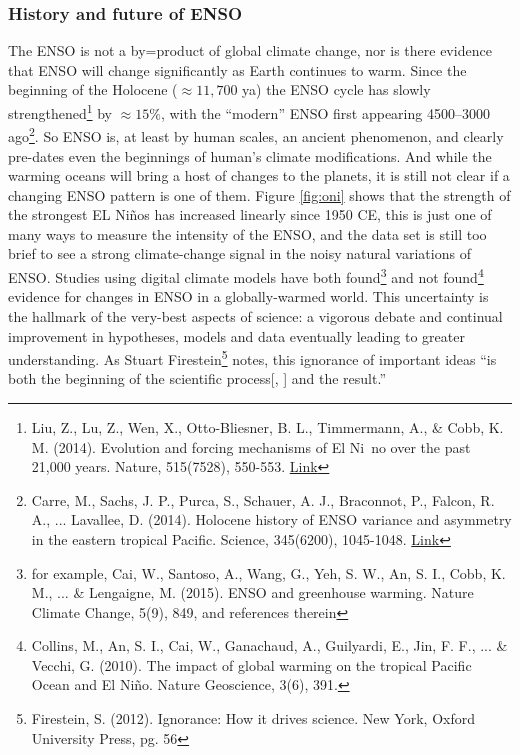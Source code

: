 {\subsubsection{History and future of ENSO}
The ENSO is not a by=product of global climate change, nor is there evidence that ENSO will change significantly as Earth continues to warm. Since the beginning of the Holocene ($\approx 11,700$ ya) the ENSO cycle has slowly strengthened\footnote{Liu, Z., Lu, Z., Wen, X., Otto-Bliesner, B. L., Timmermann, A., \& Cobb, K. M. (2014). Evolution and forcing mechanisms of El Ni~no over the past 21,000 years. Nature, 515(7528), 550-553. \href{https://doi.org/10.1038/nature13963}{Link}} by $\approx 15\%$, with the ``modern'' ENSO first appearing  \SIrange{4500}{3000}{\year} ago\footnote{Carre, M., Sachs, J. P., Purca, S., Schauer, A. J., Braconnot, P., Falcon, R. A., ... Lavallee, D. (2014). Holocene history of ENSO variance and asymmetry in the eastern tropical Pacific. Science, 345(6200), 1045-1048. \href{https://doi.org/10.1126/science.1252220}{Link}}. So ENSO is, at least by human scales, an ancient phenomenon, and clearly pre-dates even the beginnings of human's climate modifications. And while the warming oceans will bring a host of changes to the planets, it is still not clear if a changing ENSO pattern is one of them. Figure \ref{fig:oni} shows that the strength of the strongest EL Ni\~nos has increased linearly since 1950 CE, this is just one of many ways to measure the intensity of the ENSO, and the data set is still too brief to see a strong climate-change signal in the noisy natural variations of ENSO. Studies using digital climate models have both found\footnote{for example, Cai, W., Santoso, A., Wang, G., Yeh, S. W., An, S. I., Cobb, K. M., ... \& Lengaigne, M. (2015). ENSO and greenhouse warming. Nature Climate Change, 5(9), 849, and references therein} and not found\footnote{Collins, M., An, S. I., Cai, W., Ganachaud, A., Guilyardi, E., Jin, F. F., ... \& Vecchi, G. (2010). The impact of global warming on the tropical Pacific Ocean and El Ni\~no. Nature Geoscience, 3(6), 391.} evidence for changes in ENSO in a globally-warmed world. This uncertainty is the hallmark of the very-best aspects of science: a vigorous debate and continual improvement in hypotheses, models and data eventually leading to greater understanding. As Stuart Firestein\footnote{Firestein, S. (2012). Ignorance: How it drives science. New York, Oxford University Press, pg. 56} notes, this ignorance of important ideas ``is both the beginning of the scientific process[, ] and the result.'' 

}
